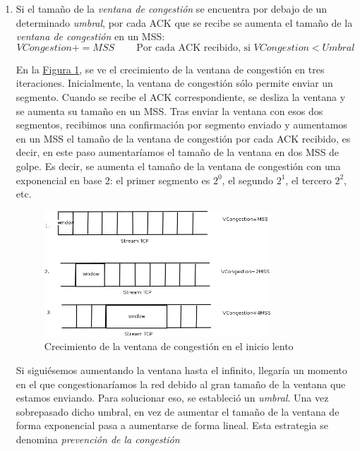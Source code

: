 \documentclass[10pt,a4paper,spanish]{report}
\begin{document}
\begin{enumerate}[\color{tema3}{$\bigstar$}]
  \item Si el tamaño de la \textit{\textcolor{tema3}{ventana de congestión}} se encuentra por debajo de un determinado \textit{\textcolor{tema3}{umbral}}, por cada ACK que se recibe se aumenta el tamaño de la \textit{\textcolor{tema3}{ventana de congestión}} en un MSS:
  \begin{displaymath}
    VCongestion += MSS \qquad\ \textrm{Por cada ACK recibido, si } VCongestion < Umbral
  \end{displaymath}

  En la \hyperref[vcongestion]{Figura \ref*{vcongestion}}, se ve el crecimiento de la ventana de congestión en tres iteraciones. Inicialmente, la ventana de congestión sólo permite enviar un segmento. Cuando se recibe el ACK correspondiente, se desliza la ventana y se aumenta su tamaño en un MSS. Tras enviar la ventana con esos dos segmentos, recibimos una confirmación por segmento enviado y aumentamos en un MSS el tamaño de la ventana de congestión por cada ACK recibido, es decir, en este paso aumentaríamos el tamaño de la ventana en dos MSS de golpe. Es decir, se aumenta el tamaño de la ventana de congestión con una exponencial en base 2: el primer segmento es $2^0$, el segundo $2^1$, el tercero $2^2$, etc.

  \begin{figure}[!h]
    \centering
    \includegraphics[width=0.8\textwidth]{vcongestion}
    \caption{Crecimiento de la ventana de congestión en el inicio lento}
    \label{vcongestion}
  \end{figure}

  Si siguiésemos aumentando la ventana hasta el infinito, llegaría un momento en el que congestionaríamos la red debido al gran tamaño de la ventana que estamos enviando. Para solucionar eso, se estableció un \textit{\textcolor{tema3}{umbral}}. Una vez sobrepasado dicho umbral, en vez de aumentar el tamaño de la ventana de forma exponencial pasa a aumentarse de forma lineal. Esta estrategia se denomina \textit{\textcolor{tema3}{prevención de la congestión}}


\end{enumerate}
\end{document}
